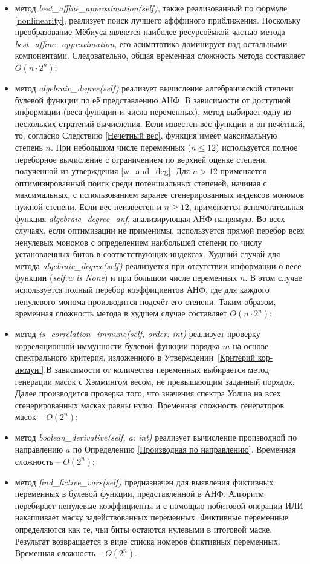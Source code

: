 \begin{itemize}
    \item метод \textit{best\_affine\_approximation(self)}, также реализованный по формуле \eqref{nonlinearity}, реализует поиск лучшего афффиного приближения. Поскольку преобразование Мёбиуса является наиболее ресурсоёмкой частью метода \textit{best\_affine\_approximation}, его асимптотика доминирует над остальными компонентами. Следовательно, общая временная сложность метода составляет $O(n \cdot 2^n)$;
    \item метод \textit{algebraic\_degree(self)} реализует вычисление алгебраической степени булевой функции по её представлению АНФ. В зависимости от доступной информации (веса функции и числа переменных), метод выбирает одну из нескольких стратегий вычисления. Если известен вес функции и он нечётный, то, согласно Следствию \eqref{Нечетный вес}, функция имеет максимальную степень $n$. При небольшом числе переменных ($n \leq 12$) используется полное переборное вычисление с ограничением по верхней оценке степени, полученной из утверждения \eqref{w_and_deg}. Для $n > 12$ применяется оптимизированный поиск среди потенциальных степеней, начиная с максимальных, с использованием заранее сгенерированных индексов мономов нужной степени. Если вес неизвестен и $n \geq 12$, применяется вспомогательная функция \textit{algebraic\_degree\_anf}, анализирующая АНФ напрямую. Во всех случаях, если оптимизации не применимы, используется прямой перебор всех ненулевых мономов с определением наибольшей степени по числу установленных битов в соответствующих индексах. Худший случай для метода \textit{algebraic\_degree(self)} реализуется при отсутствии информации о весе функции (\textit{self.w is None}) и при большом числе переменных $n$. В этом случае используется полный перебор коэффициентов АНФ, где для каждого ненулевого монома производится подсчёт его степени. Таким образом, временная сложность метода в худшем случае составляет $O(n \cdot 2^n)$;
    \item метод \textit{is\_correlation\_immune(self, order: int)} реализует проверку корреляционной иммунности булевой функции порядка $m$ на основе спектрального критерия, изложенного в Утверждении~\eqref{Критерий кор-иммун.}.В зависимости от количества переменных выбирается метод генерации масок с Хэммингом весом, не превышающим заданный порядок. Далее производится проверка того, что значения спектра Уолша на всех сгенерированных масках равны нулю. Временная сложность генераторов масок – $O(2^n)$;
    \item метод \textit{boolean\_derivative(self, a: int)} реализует вычисление производной по направлению $a$ по Определению \eqref{Производная по направлению}. Временная сложность – $O(2^n)$;
    \item метод \textit{find\_fictive\_vars(self)} предназначен для выявления фиктивных переменных в булевой функции, представленной в АНФ. Алгоритм перебирает ненулевые коэффициенты и с помощью побитовой операции ИЛИ накапливает маску задействованных переменных. Фиктивные переменные определяются как те, чьи биты остаются нулевыми в итоговой маске. Результат возвращается в виде списка номеров фиктивных переменных. Временная сложность – $O(2^n)$.


\end{itemize}
